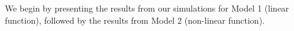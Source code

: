\documentclass[final,onefignum,onetabnum]{siuro210301}
\begin{document}

	
	We begin by presenting the results from our simulations for Model 1 (linear function), followed by the results from Model 2 (non-linear function).
	

\end{document}
